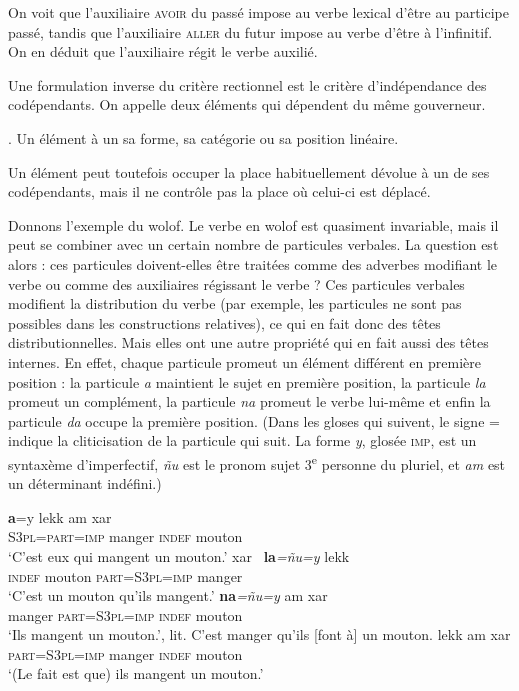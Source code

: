 On voit que l’auxiliaire \textsc{avoir} du passé impose au verbe lexical d’être au participe passé, tandis que l’auxiliaire \textsc{aller} du futur impose au verbe d’être à l’infinitif. On en déduit que l’auxiliaire régit le verbe auxilié.

Une formulation inverse du critère rectionnel est le critère d’indépendance des codépendants. On appelle  deux éléments qui dépendent du même gouverneur.

{. Un élément  à un  sa forme, sa catégorie ou sa position linéaire.}

Un élément peut toutefois occuper la place habituellement dévolue à un de ses codépendants, mais il ne contrôle pas la place où celui-ci est déplacé.

Donnons l’exemple du wolof. Le verbe en wolof est quasiment invariable, mais il peut se combiner avec un certain nombre de particules verbales. La question est alors : ces particules doivent-elles être traitées comme des adverbes modifiant le verbe ou comme des auxiliaires régissant le verbe ? Ces particules verbales modifient la distribution du verbe (par exemple, les particules ne sont pas possibles dans les constructions relatives), ce qui en fait donc des têtes distributionnelles. Mais elles ont une autre propriété qui en fait aussi des têtes internes. En effet, chaque particule promeut un élément différent en première position : la particule \textit{a} maintient le sujet en première position, la particule \textit{la} promeut un complément, la particule \textit{na} promeut le verbe lui-même et enfin la particule \textit{da} occupe la première position. (Dans les gloses qui suivent, le signe = indique la cliticisation de la particule qui suit. La forme \textit{y}, glosée \textsc{imp}, est un syntaxème d'imperfectif, \textit{ñu} est le pronom sujet 3\textsuperscript{e} personne du pluriel, et \textit{am} est un déterminant indéfini.)

\ea
\ea
{}\textbf{{a}}{=y}                {lekk}          {am}       {xar~}\\
\textsc{S3pl=part=imp} manger  \textsc{indef}  mouton\\
\glt `C’est eux qui mangent un mouton.’
\ex
{}       {xar~}          \textbf{{la}}\textit{=ñu=y}               {lekk}\\
\textsc{indef}  mouton  \textsc{part=S3pl=imp} manger\\
\glt `C’est un mouton qu’ils mangent.’
\ex
{}       \textbf{{na}}\textit{=ñu=y}             {am}       {xar~}\\
manger  \textsc{part=S3pl=imp} \textsc{indef}  mouton\\
\glt `Ils mangent un mouton.’, lit. C'est manger qu'ils [font à] un mouton.
\ex
{}   lekk         am      xar\\
\textsc{part=S3pl=imp}    manger  \textsc{indef}  mouton\\
\glt `(Le fait est que) ils mangent un mouton.’
\z
\z


